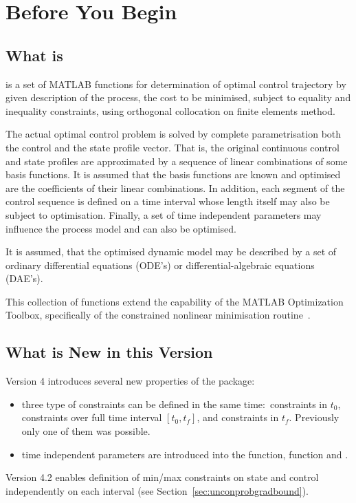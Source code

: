 \chapter{Before You Begin}
\label{cha:beforebegin}

\section{What is~}
\label{sec:whatisdynopt}

 is a set of MATLAB functions for determination of optimal
control trajectory by given description of the process, the cost to be
minimised, subject to equality and inequality constraints, using
orthogonal collocation on finite elements method. 

The actual optimal control problem is solved by complete
parametrisation both the control and the state profile vector. That
is, the original continuous control and state profiles are
approximated by a sequence of linear combinations of some basis
functions. It is assumed that the basis functions are known and
optimised are the coefficients of their linear combinations. In
addition, each segment of the control sequence is defined on a time
interval whose length itself may also be subject to
optimisation. Finally, a set of time independent parameters may
influence the process model and can also be optimised.

It is assumed, that the optimised dynamic model may be described by a
set of ordinary differential equations (ODE's) or
differential-algebraic equations (DAE's).

This collection of functions extend the capability of the MATLAB
Optimization Toolbox, specifically of the constrained nonlinear
minimisation routine~. 


\section{What is New in this Version}
\label{sec:what-new-this}


Version 4 introduces several new properties of the package:
\begin{itemize}
\item three type of constraints can be defined in the same
  time:~constraints in $t_{0}$, constraints over full time interval 
  $[t_{0},t_{f}]$, and constraints in $t_{f}$. Previously only one of
  them was possible.
\item time independent parameters are introduced into the 
  function,  function and .
\end{itemize}
Version 4.2 enables definition of min/max constraints on state and
control independently on each interval (see
Section~\ref{sec:unconprobgradbound}).

